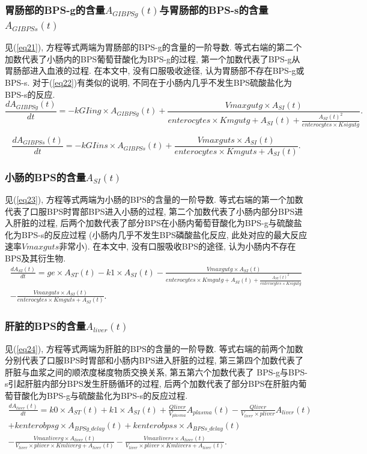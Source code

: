 \documentclass[a4paper,punct=banjiao,twoside]{ctexrep}
\theoremstyle{plain}
\theoremstyle{definition}
\theoremstyle{remark}
\begin{document}
\subsubsection*{胃肠部的BPS-g的含量$A_{GIBPSg}(t)$与胃肠部的BPS-s的含量$A_{GIBPSs}(t)$}
见(\ref{eq21}), 方程等式两端为胃肠部的BPS-g的含量的一阶导数. 等式右端的第二个加数代表了小肠内的BPS葡萄苷酸化为BPS-g的过程, 第一个加数代表了BPS-g从胃肠部进入血液的过程. 
在本文中, 没有口服吸收途径, 认为胃肠部不存在BPS-g或BPS-s. 对于(\ref{eq22})有类似的说明, 不同在于小肠内几乎不发生BPS硫酸盐化为BPS-s的反应.
\begin{equation}\label{eq21}
  \frac{dA_{GIBPSg}(t)}{dt}=-kGIing \times  A_{GIBPSg}(t)+\frac{Vmaxgutg \times  A_{SI}(t)}{enterocytes \times  Kmgutg+A_{SI}(t)+\frac{A_{SI}(t)^2}{enterocytes \times  Ksigutg}}.
\end{equation}

\begin{equation}\label{eq22}
  \frac{dA_{GIBPSs}(t)}{dt}=-kGIins \times  A_{GIBPSs}(t)+\frac{Vmaxguts \times  A_{SI}(t)}{enterocytes \times  Kmguts+A_{SI}(t)}.
\end{equation}
\subsubsection*{小肠的BPS的含量$A_{SI}(t)$}
见(\ref{eq23}), 方程等式两端为小肠的BPS的含量的一阶导数. 等式右端的第一个加数代表了口服BPS时胃部BPS进入小肠的过程, 第二个加数代表了小肠内部分BPS进入肝脏的过程, 后两个加数代表了部分BPS在小肠内葡萄苷酸化为BPS-g与硫酸盐化为BPS-s的反应过程
(小肠内几乎不发生BPS磷酸盐化反应, 此处对应的最大反应速率$Vmaxguts$非常小). 
在本文中, 没有口服吸收BPS的途径, 认为小肠内不存在BPS及其衍生物. 
\begin{multline}\label{eq23}
  \frac{dA_{SI}(t)}{dt}=ge \times  A_{ST}(t)-k1 \times  A_{SI}(t)-\frac{Vmaxgutg \times  A_{SI}(t)}{enterocytes \times  Kmgutg+A_{SI}(t)+\frac{A_{SI}(t)^2}{enterocytes \times  Ksigutg}}\\
  -\frac{Vmaxguts \times  A_{SI}(t)}{enterocytes \times  Kmguts+A_{SI}(t)}.
\end{multline}
\subsubsection*{肝脏的BPS的含量$A_{liver}(t)$}
见(\ref{eq24}), 方程等式两端为肝脏的BPS的含量的一阶导数. 等式右端的前两个加数分别代表了口服BPS时胃部和小肠内BPS进入肝脏的过程, 第三第四个加数代表了肝脏与血浆之间的顺浓度梯度物质交换关系, 第五第六个加数代表了
BPS-g与BPS-s引起肝脏内部分BPS发生肝肠循环的过程, 后两个加数代表了部分BPS在肝脏内葡萄苷酸化为BPS-g与硫酸盐化为BPS-s的反应过程. 
\begin{multline}\label{eq24}
  \frac{dA_{liver}(t)}{dt}=k0 \times  A_{ST}(t)+k1 \times  A_{SI}(t)+\frac{Qliver}{V_{plasma} } A_{plasma}(t)-\frac{Qliver}{V_{liver}  \times  pliver} A_{liver}(t)\\
  +kenterobpsg \times  A_{BPSg\_delay}(t)+kenterobpss \times  A_{BPSs\_delay}(t)\\
  -\frac{Vmaxliverg \times  A_{liver}(t)}{V_{liver}  \times  pliver \times  Kmliverg+A_{liver}(t)}-\frac{Vmaxlivers \times  A_{liver}(t)}{V_{liver}  \times  pliver \times  Kmlivers+A_{liver}(t)}.
\end{multline}
\end{document}
